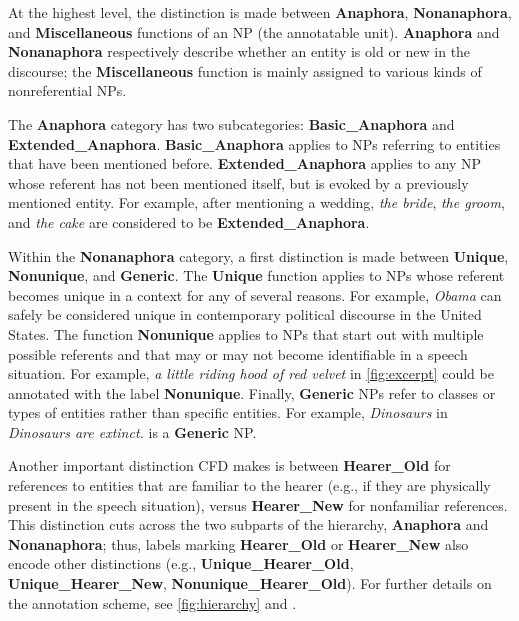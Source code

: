 \documentclass[11pt,letterpaper]{article}
\begin{document}
At the highest level, the distinction is made between {\bf Anaphora}, {\bf Nonanaphora}, and {\bf Miscellaneous} 
functions of an NP (the annotatable unit). {\bf Anaphora} and {\bf Nonanaphora} respectively describe 
whether an entity is old or new in the discourse; 
the {\bf Miscellaneous} function is mainly assigned to various kinds of nonreferential NPs. 

The {\bf Anaphora} category has two subcategories: {\bf Basic\_Anaphora} and {\bf Extended\_Anaphora}. 
{\bf Basic\_Anaphora} applies to NPs referring to entities that have been mentioned before. 
{\bf Extended\_Anaphora} applies to any NP whose referent has not been mentioned itself, but is evoked by a previously mentioned entity. 
For example, after mentioning a wedding, {\em the bride}, {\em the groom}, and {\em the cake} 
are considered to be {\bf Extended\_Anaphora}.  

Within the {\bf Nonanaphora} category, a first distinction is made between {\bf Unique}, {\bf Nonunique}, and {\bf Generic}. 
The {\bf Unique} function applies to NPs whose referent becomes unique in a context for any of several reasons. 
For example, {\em Obama} can safely be considered unique in contemporary political discourse in the United States. 
The function {\bf Nonunique} applies to NPs that start out with multiple possible referents 
and that may or may not become identifiable in a speech situation. 
For example, {\em a little riding hood of red velvet} in \cref{fig:excerpt} could be annotated with the label {\bf Nonunique}. 
Finally, {\bf Generic} NPs refer to classes or types of entities rather than specific entities. 
For example, {\em Dinosaurs} in {\em Dinosaurs are extinct.} is a {\bf Generic} NP. 

Another important distinction CFD makes is between {\bf Hearer\_Old} 
for references to entities that are familiar to the hearer (e.g., if they are physically present in the speech situation), 
versus {\bf Hearer\_New} for nonfamiliar references. 
This distinction cuts across the two subparts of the hierarchy, {\bf Anaphora} and {\bf Nonanaphora}; 
thus, labels marking {\bf Hearer\_Old} or {\bf Hearer\_New} also encode other distinctions (e.g., {\bf Unique\_Hearer\_Old}, {\bf Unique\_Hearer\_New}, {\bf Nonunique\_Hearer\_Old}).
For further details on the annotation scheme, see \cref{fig:hierarchy} and \citet{bhatia14}.
\end{document}
